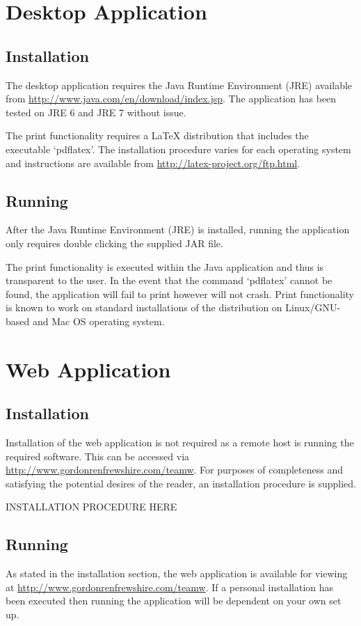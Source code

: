 \section{Desktop Application}

\subsection{Installation}

The desktop application requires the Java Runtime Environment (JRE) available 
from \url{http://www.java.com/en/download/index.jsp}. The application has been 
tested on JRE 6 and JRE 7 without issue.

The print functionality requires a LaTeX distribution that includes the
executable `pdflatex'. The installation procedure varies for each operating
system and instructions are available from
\url{http://latex-project.org/ftp.html}.

\subsection{Running}

After the Java Runtime Environment (JRE) is installed, running the application
only requires double clicking the supplied JAR file.

The print functionality is executed within the Java application and thus is
transparent to the user. In the event that the command `pdflatex' cannot be
found, the application will fail to print however will not crash. Print
functionality is known to work on standard installations of the distribution
on Linux/GNU-based and Mac OS operating system.

\section{Web Application}

\subsection{Installation}

Installation of the web application is not required as a remote host is running
the required software. This can be accessed via 
\url{http://www.gordonrenfrewshire.com/teamw}. For purposes of completeness
and satisfying the potential desires of the reader, an installation procedure
is supplied.

INSTALLATION PROCEDURE HERE

\subsection{Running}

As stated in the installation section, the web application is available for
viewing at \url{http://www.gordonrenfrewshire.com/teamw}. If a personal
installation has been executed then running the application will be dependent
on your own set up.